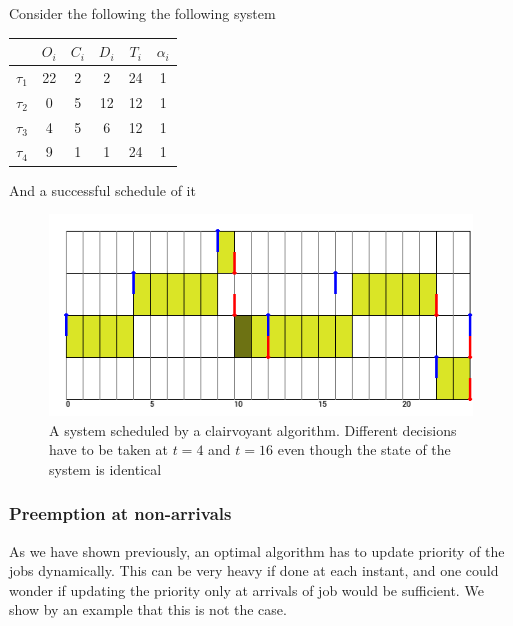 \documentclass[a4paper,10pt]{article}
\begin{document}
        Consider the following the following system

        \begin{center}
            \begin{tabular}{|r|c|c|c|c|c|}
                \hline
                            & $O_i$ & $C_i$ & $D_i$ & $T_i$ & $\alpha_i$ \\ \hline
                $\tau_1$    & 22    & 2     & 2    & 24    & 1     \\ \hline
                $\tau_2$    & 0     & 5     & 12   & 12    & 1     \\ \hline
                $\tau_3$    & 4     & 5     & 6    & 12    & 1     \\ \hline
                $\tau_4$    & 9     & 1     & 1    & 24    & 1     \\ \hline
            \end{tabular}
        \end{center}

        And a successful schedule of it

        \begin{figure}[H]
        \begin{center}
            \includegraphics[scale=0.7]{figs/clairvoyance_example.png}
            \caption{A system scheduled by a clairvoyant algorithm. Different decisions have to be taken at $t=4$ and $t=16$ even though the state of the system is identical}
            \label{fig:clairvoyance}
        \end{center}
        \end{figure}


        \subsubsection{Preemption at non-arrivals}

        As we have shown previously, an optimal algorithm has to update priority of the jobs dynamically. This can be very heavy if done at each instant, and one could wonder if updating the priority only at arrivals of job would be sufficient. We show by an example that this is not the case.\\
\end{document}
